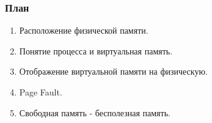 \begin{frame}
\frametitle{План}

\begin{enumerate}
  \item Расположение физической памяти.
  \item Понятие процесса и виртуальная память.
  \item Отображение виртуальной памяти на физическую.
  \item Page Fault.
  \item Свободная память - бесполезная память.
\end{enumerate}
\end{frame}
